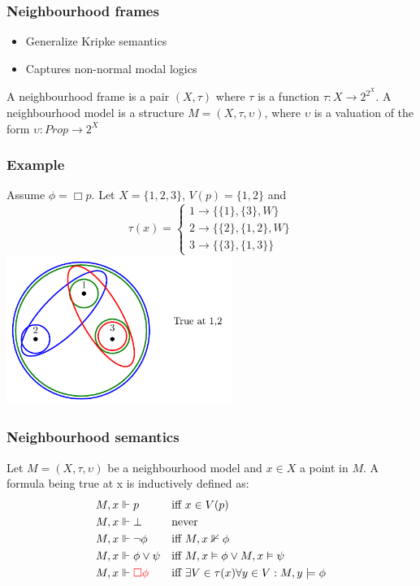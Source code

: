 \documentclass[hyperref={pdfpagelabels=false},t,10pt]{beamer}
\begin{document}
\begin{frame}
  \frametitle{Neighbourhood frames}
    \begin{itemize}
      \item Generalize Kripke semantics
      \item Captures non-normal modal logics
    \end{itemize}

    \pause
    \begin{definition}
      A neighbourhood frame is a pair $(X, \tau)$ where $\tau$ is a function $\tau : X \rightarrow 2^{2^X}$. \newline
      A neighbourhood model is a structure $M = (X, \tau, \upsilon)$, where $\upsilon$ is a valuation of the form $\upsilon : Prop \rightarrow 2^X$
    \end{definition}
\end{frame}

\begin{frame}
  \frametitle{Example}
      Assume $\phi = \Box p$. Let $X = \{1,2,3\}$, $V(p) = \{1,2\}$ and 
    \[
            \tau(x) = 
            \begin{cases}
                1 \rightarrow \{\{1\}, \{3\}, W\} \\
                2 \rightarrow \{\{2\}, \{1,2\}, W\} \\
                3 \rightarrow \{\{3\}, \{1,3\}\}
            \end{cases}
    \] 
    \centering
      \includegraphics[width=0.55\textwidth]{Example3.pdf}
\end{frame}

\begin{frame}
  \frametitle{Neighbourhood semantics}
  \begin{definition}
  Let $M = (X,\tau,\upsilon)$ be a neighbourhood model and $x \in X$ a point in $M$. A formula being true at x is inductively defined as:
      \begin{align*}
        M,x &\Vdash p &&\text{iff } x \in V(p)\\
        M,x &\Vdash \bot &&\text{never } \\
        M,x &\Vdash \neg \phi &&\text{iff } M,x \nVdash \phi\\
        M,x &\Vdash \phi \lor \psi &&\text{iff } M,x \vDash \phi \lor M,x \vDash \psi\\
        M,x &\Vdash \textcolor{red}{\Box \phi} &&\text{iff } \exists V \in \tau(x) \forall y \in V : M,y \models \phi
    \end{align*}
  \end{definition}
\end{frame}
\end{document}
